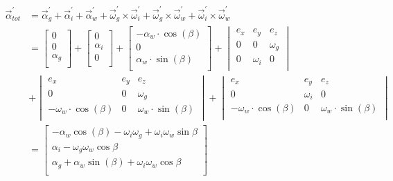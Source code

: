 \begin{equation}
\begin{split}
\vec{\alpha}_{tot}^{'} &= \vec{\alpha}_{g}^{'} + \vec{\alpha}_{i}^{'} + \vec{\alpha}_{w}^{'} + \vec{\omega}_{g}^{'} \times \vec{\omega}_{i}^{'} + \vec{\omega}_{g}^{'} \times \vec{\omega}_{w}^{'} + \vec{\omega}_{i}^{'} \times \vec{\omega}_{w}^{'}\\
&=\begin{bmatrix}
0						\\
0						\\
\alpha_{g}	\\
\end{bmatrix}
+\begin{bmatrix}
0						\\
\alpha_{i}	\\
0						\\
\end{bmatrix}
+\begin{bmatrix}
-\alpha_{w}\cdot \cos(\beta)	\\
0						\\
\alpha_{w}\cdot \sin(\beta)	\\
\end{bmatrix}
+\begin{vmatrix}
e_{x}&e_{y}&e_{z}\\
0&0&\omega_{g}\\
0&\omega_{i}&0\\
\end{vmatrix}\\
&+\begin{vmatrix}
e_{x}&e_{y}&e_{z}\\
0&0&\omega_{g}\\
-\omega_{w}\cdot \cos(\beta)&0&\omega_{w}\cdot \sin(\beta)\\
\end{vmatrix}
+\begin{vmatrix}
e_{x}&e_{y}&e_{z}\\
0&\omega_{i}&0\\
-\omega_{w}\cdot \cos(\beta)&0&\omega_{w}\cdot \sin(\beta)\\
\end{vmatrix}\\
&=\begin{bmatrix}
-\alpha_{w}\cos(\beta)-\omega_{i}\omega_{g}+\omega_{i}\omega_{w}\sin{\beta}\\
\alpha_{i}-\omega_{g}\omega_{w}\cos{\beta}\\
\alpha_{g}+	\alpha_{w} \sin(\beta)+\omega_{i}\omega_{w}\cos{\beta}\\
\end{bmatrix}
\label{eq:kin1.8}
\end{split}
\end{equation}
